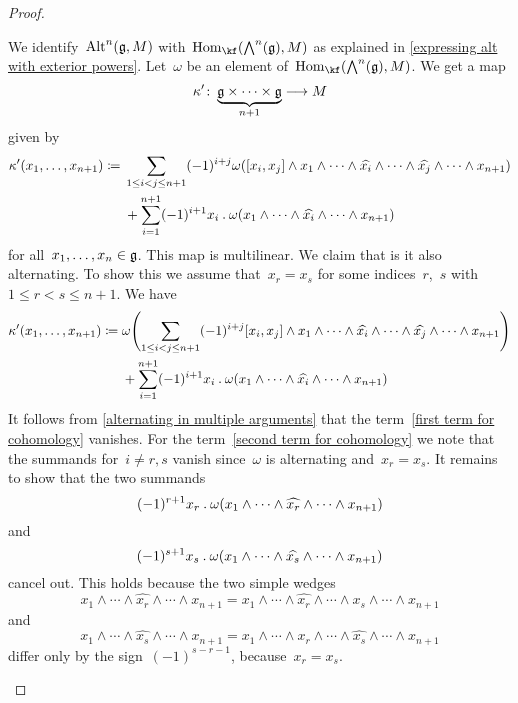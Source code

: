 \begin{proof}
\begin{enumerate}
      We identify~$\operatorname{Alt}^n(\mathfrak{g}, M)$ with~$\Hom_{\kf}( \Exterior^n(\glie), M)$ as explained in \cref{expressing alt with exterior powers}.
      Let~$\omega$ be an element of~$\Hom_{\kf}( \Exterior^n(\glie), M )$.
      We get a map
      \[
        \kappa'
        \colon
        \underbrace{ \glie \times \dotsb \times \glie }_{n+1}
        \to
        M
      \]
      given by
      \begin{align*}
        \kappa'(x_1, \dotsc, x_{n+1})
        \coloneqq
        {}&
        \sum_{1 \leq i < j \leq n+1}
        (-1)^{i+j}
        \omega
        (
          [x_i, x_j] \wedge x_1 \wedge \dotsb \wedge \widehat{x_i} \wedge \dotsb \wedge \widehat{x_j} \wedge \dotsb \wedge x_{n+1}
        )
        \\
        {}&
        +
        \sum_{i=1}^{n+1}
        (-1)^{i+1}
        x_i \mathbin{.} \omega(x_1 \wedge \dotsb \wedge \widehat{x_i} \wedge \dotsb \wedge x_{n+1})
      \end{align*}
      for all~$x_1, \dotsc, x_n \in \mathfrak{g}$.
      This map is multilinear.
      We claim that is it also alternating.
      To show this we assume that~$x_r = x_s$ for some indices~$r$,~$s$ with~$1 \leq r < s \leq n+1$.
      We have
      \begin{align}
        \kappa'(x_1, \dotsc, x_{n+1})
        \coloneqq
        {}&
        \omega
        \Biggl(
          \sum_{1 \leq i < j \leq n+1}
          (-1)^{i+j}
          [x_i, x_j] \wedge x_1 \wedge \dotsb \wedge \widehat{x_i} \wedge \dotsb \wedge \widehat{x_j} \wedge \dotsb \wedge x_{n+1}
        \Biggr)
        \label{first term for cohomology}
        \\
        {}&
        +
        \sum_{i=1}^{n+1}
        (-1)^{i+1}
        x_i \mathbin{.} \omega(x_1 \wedge \dotsb \wedge \widehat{x_i} \wedge \dotsb \wedge x_{n+1})
        \label{second term for cohomology}
      \end{align}
      It follows from \cref{alternating in multiple arguments} that the term~\eqref{first term for cohomology} vanishes.
      For the term~\eqref{second term for cohomology} we note that the summands for~$i \neq r,s$ vanish since~$\omega$ is alternating and~$x_r = x_s$.
      It remains to show that the two summands
      \[
        (-1)^{r+1}
        x_r \mathbin{.} \omega(x_1 \wedge \dotsb \wedge \widehat{x_r} \wedge \dotsb \wedge x_{n+1})
      \]
      and
      \[
        (-1)^{s+1}
        x_s \mathbin{.} \omega(x_1 \wedge \dotsb \wedge \widehat{x_s} \wedge \dotsb \wedge x_{n+1})
      \]
      cancel out.
      This holds because the two simple wedges
      \[
        x_1 \wedge \dotsb \wedge \widehat{x_r} \wedge \dotsb \wedge x_{n+1}
        =
        x_1 \wedge \dotsb \wedge \widehat{x_r} \wedge \dotsb \wedge x_s \wedge \dotsb \wedge x_{n+1}
      \]
      and
      \[
        x_1 \wedge \dotsb \wedge \widehat{x_s} \wedge \dotsb \wedge x_{n+1}
        =
        x_1 \wedge \dotsb \wedge x_r \wedge \dotsb \wedge \widehat{x_s} \wedge \dotsb \wedge x_{n+1}
      \]
      differ only by the sign~$(-1)^{s-r-1}$, because~$x_r = x_s$.


\end{enumerate}
\end{proof}
